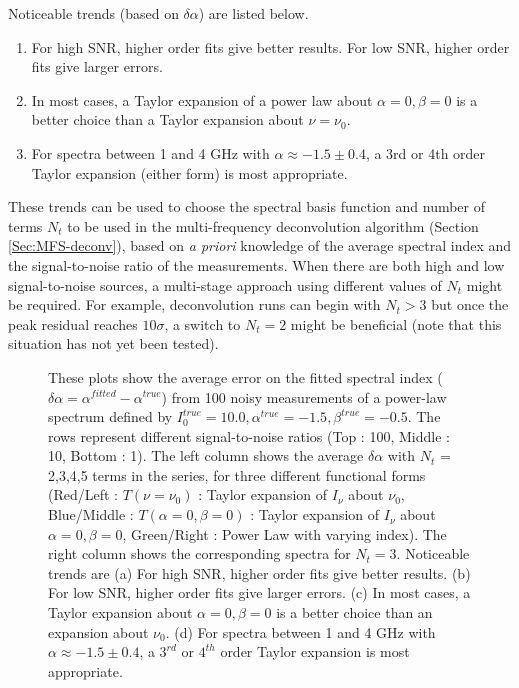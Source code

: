 \documentclass[structabstract]{stylefiles/aa}
\begin{document}
\noindent Noticeable trends (based on $\delta\alpha$) are listed below.
\begin{enumerate}
\item For high SNR, higher order fits give better results.
For low SNR, higher order fits give larger errors.
\item In most cases, a Taylor expansion of a power law about $\alpha=0,\beta=0$ is a better 
choice than a Taylor expansion about $\nu=\nu_0$.
\item For spectra between 1 and 4 GHz with $\alpha \approx -1.5 \pm 0.4$, a 3rd or
4th order Taylor expansion (either form) is most appropriate.
\end{enumerate}
These trends can be used to choose the spectral basis function and number of terms $N_t$ 
to be used in the multi-frequency deconvolution algorithm (Section \ref{Sec:MFS-deconv}),
based on {\it a priori} knowledge of the average spectral index
and the signal-to-noise ratio of the measurements. 
When there are both high and low signal-to-noise sources, a multi-stage approach 
using different values of $N_t$ might be required.
For example, deconvolution runs can begin with $N_t>3$ but once the peak residual
reaches $10\sigma$, a switch to $N_t=2$ might be beneficial 
(note that this situation has not yet been tested).



\begin{figure}
\begin{center}
\caption[Error Estimates for Spectral Index]
{\small These plots show the average error on the fitted spectral index
	($\delta\alpha = \alpha^{fitted}-\alpha^{true}$) from 
100 noisy measurements of a power-law spectrum defined by
$I^{true}_0=10.0,\alpha^{true}=-1.5,\beta^{true}=-0.5$.
The rows represent different signal-to-noise ratios (Top : 100, Middle : 10, Bottom : 1). 
The left column shows the average $\delta\alpha$ with $N_{t}$ = 2,3,4,5 terms in 
the series, for three different functional forms (Red/Left : $T(\nu=\nu_0)$ : Taylor expansion
of $I_{\nu}$ about $\nu_0$, Blue/Middle : $T(\alpha=0,\beta=0)$ : Taylor expansion of $I_{\nu}$ about
$\alpha=0,\beta=0$, Green/Right : Power Law with varying index).  
The right column shows the corresponding spectra for $N_{t}=3$.
Noticeable trends are 
(a) For high SNR, higher order fits give better results.
(b) For low SNR, higher order fits give larger errors.
(c) In most cases, a Taylor expansion about $\alpha=0,\beta=0$ is a better choice
than an expansion about $\nu_0$.
(d) For spectra between 1 and 4 GHz with $\alpha \approx -1.5 \pm 0.4$, a $3^{rd}$ or $4^{th}$ order
Taylor expansion is most appropriate.}
\label{Fig:SpecError}
\end{center}
\end{figure}
\end{document}
